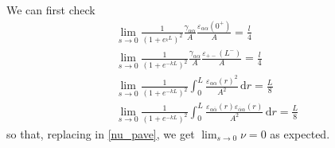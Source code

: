\documentclass[pre,aps,superscriptaddress,nofootinbib]{revtex4}
\begin{document}
We can first check
\begin{eqnarray}
\lim_{s \to 0} \frac{1}{(1 + e^{_k L})^2} \frac{\gamma_{\alpha\alpha}}{A} \frac{\varepsilon_{\alpha\alpha}(0^+)}{A} = \frac{l}{4}\\
\lim_{s \to 0} \frac{1}{(1 + e^{-k L})^2} \frac{\gamma_{\alpha\alpha}}{A} \frac{\varepsilon_{+-}(L^-)}{A} = \frac{l}{4}\\
\lim_{s \to 0} \frac{1}{(1 + e^{-k L})^2} \int_0^L \frac{\varepsilon_{\alpha\alpha}(r)^2}{A^2} \, \mathrm{d}r = \frac{L}{8}\\
\lim_{s \to 0} \frac{1}{(1 + e^{-k L})^2} \int_0^L \frac{\varepsilon_{\alpha\overline{\alpha}}(r)\varepsilon_{\overline{\alpha}\alpha}(r)}{A^2} \, \mathrm{d}r = \frac{L}{8}
\end{eqnarray}
so that, replacing in \eqref{nu_pave}, we get $\lim_{s \to 0} \nu = 0$ as expected.\\
\end{document}
